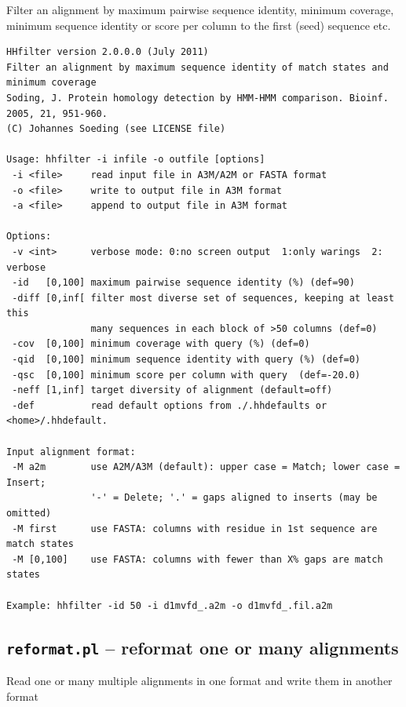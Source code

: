 \documentclass[11pt,a4paper]{article}
\begin{document}
Filter an alignment by maximum pairwise sequence identity, minimum coverage,
minimum sequence identity or score per column to the first (seed) sequence etc.

\small \begin{verbatim}
HHfilter version 2.0.0.0 (July 2011)
Filter an alignment by maximum sequence identity of match states and minimum coverage
Soding, J. Protein homology detection by HMM-HMM comparison. Bioinf. 2005, 21, 951-960.
(C) Johannes Soeding (see LICENSE file)

Usage: hhfilter -i infile -o outfile [options]                  
 -i <file>     read input file in A3M/A2M or FASTA format                 
 -o <file>     write to output file in A3M format                         
 -a <file>     append to output file in A3M format                        

Options:                                                                  
 -v <int>      verbose mode: 0:no screen output  1:only warings  2: verbose
 -id   [0,100] maximum pairwise sequence identity (%) (def=90)   
 -diff [0,inf[ filter most diverse set of sequences, keeping at least this    
               many sequences in each block of >50 columns (def=0)
 -cov  [0,100] minimum coverage with query (%) (def=0) 
 -qid  [0,100] minimum sequence identity with query (%) (def=0) 
 -qsc  [0,100] minimum score per column with query  (def=-20.0)
 -neff [1,inf] target diversity of alignment (default=off)
 -def          read default options from ./.hhdefaults or <home>/.hhdefault. 

Input alignment format:                                                    
 -M a2m        use A2M/A3M (default): upper case = Match; lower case = Insert;
               '-' = Delete; '.' = gaps aligned to inserts (may be omitted)   
 -M first      use FASTA: columns with residue in 1st sequence are match states
 -M [0,100]    use FASTA: columns with fewer than X% gaps are match states   
                                                                          
Example: hhfilter -id 50 -i d1mvfd_.a2m -o d1mvfd_.fil.a2m      
\end{verbatim} \normalsize

\subsection{{\tt reformat.pl} -- reformat one or many alignments}

Read one or many multiple alignments in one format and write them in another format
\end{document}
